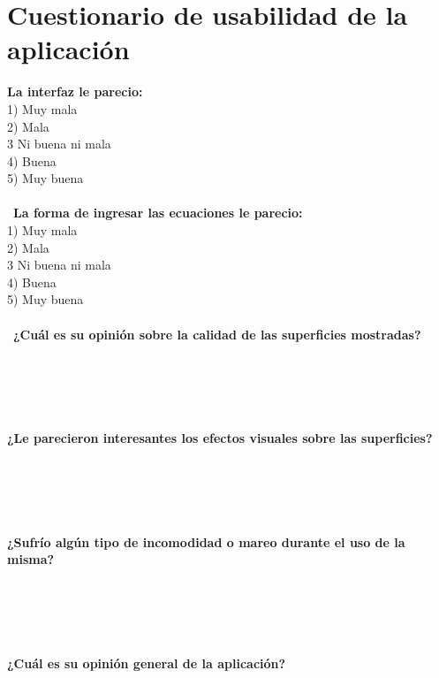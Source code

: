 \documentclass[12pt]{article}
\begin{document}
\section{Cuestionario de usabilidad de la aplicación}
\textbf{La interfaz le parecio:}
\\ 1) Muy mala
\\ 2) Mala
\\ 3 Ni buena ni mala
\\ 4) Buena
\\ 5) Muy buena
\\\\\
\textbf{La forma de ingresar las ecuaciones le parecio:}
\\ 1) Muy mala
\\ 2) Mala
\\ 3 Ni buena ni mala
\\ 4) Buena
\\ 5) Muy buena
\\\\\
\textbf{¿Cuál es su opinión sobre la calidad de las superficies mostradas?}
\\\\\\\\\\\\
\textbf{¿Le parecieron interesantes los efectos visuales sobre las superficies?}
\\\\\\\\\\\\
\textbf{¿Sufrío algún tipo de incomodidad o mareo durante el uso de la misma?}
\\\\\\\\\\\\
\textbf{¿Cuál es su opinión general de la aplicación?}
\clearpage
\end{document}

